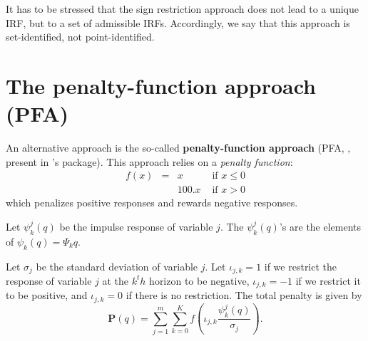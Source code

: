 \documentclass[
  12pt,
]{book}
\newenvironment{Shaded}{\begin{snugshade}}{\end{snugshade}}
\newcommand{\CommentTok}[1]{\textcolor[rgb]{0.56,0.35,0.01}{\textit{#1}}}
\newcommand{\NormalTok}[1]{#1}
\newcommand{\OtherTok}[1]{\textcolor[rgb]{0.56,0.35,0.01}{#1}}
\newcommand{\SpecialCharTok}[1]{\textcolor[rgb]{0.81,0.36,0.00}{\textbf{#1}}}
\theoremstyle{definition}
\theoremstyle{definition}
\theoremstyle{definition}
\theoremstyle{definition}
\theoremstyle{remark}
\begin{document}
\begin{Shaded}
\end{Shaded}

It has to be stressed that the sign restriction approach does not lead to a unique IRF, but to a set of admissible IRFs. Accordingly, we say that this approach is set-identified, not point-identified.

\section{The penalty-function approach (PFA)}\label{the-penalty-function-approach-pfa}

An alternative approach is the so-called \textbf{penalty-function approach} (PFA, \citet{Uhlig_2005}, present in \citet{Danne_2015}'s package). This approach relies on a \emph{penalty function}:
\[
\begin{array}{llll}f(x)&=&x&\text{ if }x\le0\\
&&100.x&\text{ if }x>0\end{array}
\]
which penalizes positive responses and rewards negative responses.

Let \(\psi_k^j(q)\) be the impulse response of variable \(j\). The \(\psi_k^j(q)\)'s are the elements of \(\psi_k(q)=\Psi_kq\).

Let \(\sigma_j\) be the standard deviation of variable \(j\). Let \(\iota_{j,k}=1\) if we restrict the response of variable \(j\) at the \(k^th\) horizon to be negative, \(\iota_{j,k}=-1\) if we restrict it to be positive, and \(\iota_{j,k}=0\) if there is no restriction. The total penalty is given by \[
\mathbf{P}(q)=\sum_{j=1}^m\sum_{k=0}^Kf\left(\iota_{j,k}\frac{\psi_k^j(q)}{\sigma_j}\right).
\]
\end{document}
